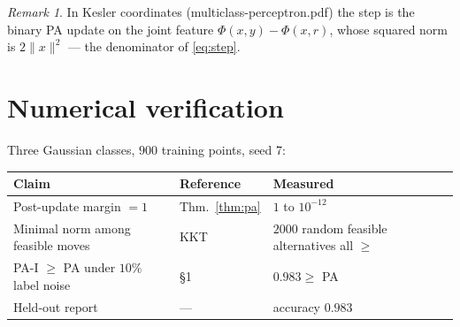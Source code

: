 \documentclass[11pt]{article}
\theoremstyle{remark}
\newtheorem{remark}{Remark}
\begin{document}
\begin{remark}
In Kesler coordinates (multiclass-perceptron.pdf) the step is the
binary PA update on the joint feature
$\Phi(x,y) - \Phi(x,r)$, whose squared norm is $2\|x\|^2$ ---
the denominator of \eqref{eq:step}.
\end{remark}

\section{Numerical verification}

Three Gaussian classes, $900$ training points, seed 7:

\begin{center}
\begin{tabular}{lll}
\toprule
Claim & Reference & Measured\\
\midrule
Post-update margin $= 1$ & Thm.~\ref{thm:pa} & $1$ to $10^{-12}$\\
Minimal norm among feasible moves & KKT & $2000$ random feasible
  alternatives all $\ge$\\
PA-I $\ge$ PA under $10\%$ label noise & \S1 & $0.983 \ge$ PA\\
Held-out report & --- & accuracy $0.983$\\
\bottomrule
\end{tabular}
\end{center}
\end{document}
